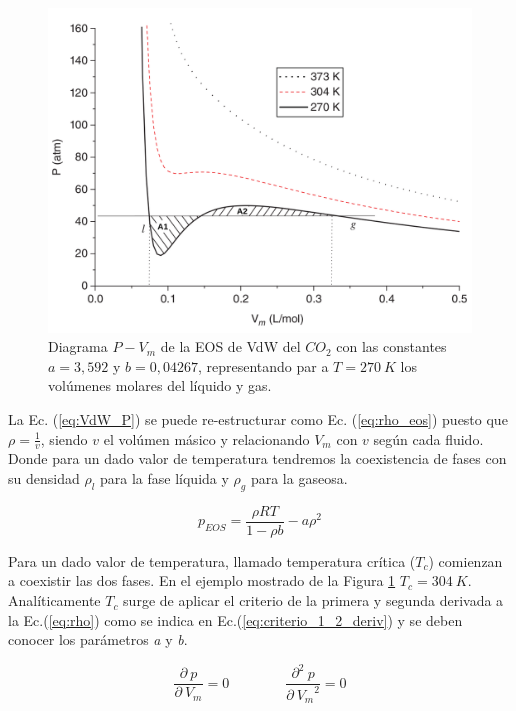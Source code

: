 \begin{figure}[h!]
	\centering
	\includegraphics[width=.8\textwidth]{figs/cap4/Diagrama_P_V_del_CO2_Multiphase_LBM}
	\caption{Diagrama $P - V_m$ de la EOS de VdW del $CO_2$ con las constantes $a = 3,592$ y $b = 0,04267$, representando par a $T = 270 \> K$ los volúmenes molares del líquido y gas. \cite{huang2015multiphase}}
	\label{fig:P_V_CO2}	
\end{figure}


La Ec. (\ref{eq:VdW_P}) se puede re-estructurar como Ec. (\ref{eq:rho_eos}) puesto que $\rho = \frac{1}{v}$, siendo $v$ el volúmen másico y relacionando $V_m$ con $v$ según cada fluido. Donde para un dado valor de temperatura tendremos la coexistencia de fases con su densidad $\rho_l$ para la fase líquida y $\rho_g$ para la gaseosa.

\begin{equation*}
p_{EOS} = \frac{\rho R T}{1- \rho b} - a {\rho}^{2} \nonumber 
\end{equation*}

Para un dado valor de temperatura, llamado temperatura crítica (\textit{$T_c$}) comienzan a coexistir las dos fases. En el ejemplo mostrado de la Figura \ref{fig:P_V_CO2} $T_c = 304 \> K$. Analíticamente $T_c$ surge de aplicar el criterio de la primera y segunda derivada a la Ec.(\ref{eq:rho}) como se indica en Ec.(\ref{eq:criterio_1_2_deriv}) y se deben conocer los parámetros \textit{a} y \textit{b}.

\begin{equation}
	\frac{\partial\> p}{\partial\> V_{m}} = 0 \qquad \qquad \frac{\partial^{2} \> p}{\partial\> {V_{m}}^{2}} = 0
	\label{eq:criterio_1_2_deriv}
\end{equation}

